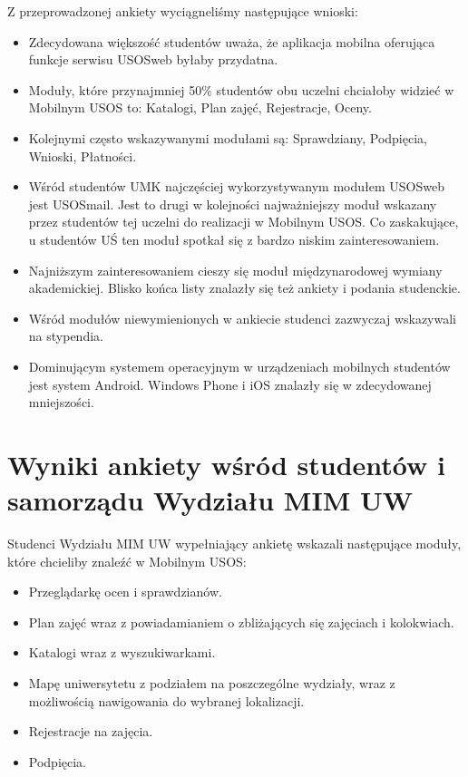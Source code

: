 \documentclass{pracamgr}
\begin{document}
Z przeprowadzonej ankiety wyciągneliśmy następujące wnioski:
\begin{itemize}
	\item Zdecydowana większość studentów uważa, że aplikacja mobilna oferująca funkcje serwisu USOSweb byłaby przydatna.
	\item Moduły, które przynajmniej 50\% studentów obu uczelni chciałoby widzieć w Mobilnym USOS to: Katalogi, Plan zajęć, Rejestracje, Oceny.
	\item Kolejnymi często wskazywanymi modułami są: Sprawdziany, Podpięcia, Wnioski, Płatności.
	\item Wśród studentów UMK najczęściej wykorzystywanym modułem USOSweb jest USOSmail. Jest to drugi w kolejności najważniejszy moduł wskazany przez studentów tej uczelni do realizacji w Mobilnym USOS. Co zaskakujące, u studentów UŚ ten moduł spotkał się z bardzo niskim zainteresowaniem.
	\item Najniższym zainteresowaniem cieszy się moduł międzynarodowej wymiany akademickiej. Blisko końca listy znalazły się też ankiety i podania studenckie.
	\item Wśród modułów niewymienionych w ankiecie studenci zazwyczaj wskazywali na stypendia.
	\item Dominującym systemem operacyjnym w urządzeniach mobilnych studentów jest system Android. Windows Phone i iOS znalazły się w zdecydowanej mniejszości.
\end{itemize}

\section{Wyniki ankiety wśród studentów i samorządu Wydziału MIM UW}

Studenci Wydziału MIM UW wypełniający ankietę wskazali następujące moduły, które
chcieliby znaleźć w Mobilnym USOS:

\begin{itemize}
	\item Przeglądarkę ocen i sprawdzianów.
	\item Plan zajęć wraz z powiadamianiem o zbliżających się zajęciach
	      i kolokwiach.
	\item Katalogi wraz z wyszukiwarkami.
	\item Mapę uniwersytetu z podziałem na poszczególne wydziały, wraz z
	      możliwością nawigowania do wybranej lokalizacji.
	\item Rejestracje na zajęcia.
	\item Podpięcia.
\end{itemize}
\end{document}
